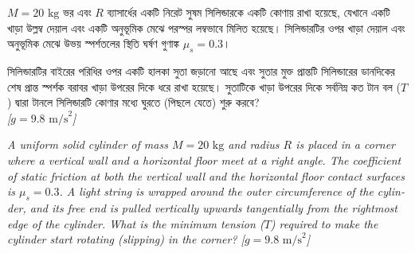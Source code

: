 \documentclass[12pt, a4paper]{article}
\begin{document}
\begin{tcolorbox}[questionbox={প্রশ্ন (Question) 8}]
\noindent
$M = 20\text{ kg}$ ভর এবং $R$ ব্যাসার্ধের একটি নিরেট সুষম সিলিন্ডারকে একটি কোণায় রাখা হয়েছে, যেখানে একটি খাড়া উল্লম্ব দেয়াল এবং একটি অনুভূমিক মেঝে পরস্পর লম্বভাবে মিলিত হয়েছে। সিলিন্ডারটির ওপর খাড়া দেয়াল এবং অনুভূমিক মেঝে উভয় স্পর্শতলের স্থিতি ঘর্ষণ গুণাঙ্ক $\mu_s = 0.3$। 

\vspace{0.3em}
\noindent
সিলিন্ডারটির বাইরের পরিধির ওপর একটি হালকা সুতা জড়ানো আছে এবং সুতার মুক্ত প্রান্তটি সিলিন্ডারের ডানদিকের শেষ প্রান্ত স্পর্শক বরাবর খাড়া উপরের দিকে ধরে রাখা হয়েছে। সুতাটিকে খাড়া উপরের দিকে সর্বনিম্ন কত টান বল ($T$) দ্বারা টানলে সিলিন্ডারটি কোণার মধ্যে ঘুরতে (পিছলে যেতে) শুরু করবে? \\
\textit{[$g = 9.8\text{ m/s}^2$]}

\vspace{0.8em}
\begin{english}
\noindent\textit{\color{darkgray}
A uniform solid cylinder of mass $M = 20\text{ kg}$ and radius $R$ is placed in a corner where a vertical wall and a horizontal floor meet at a right angle. The coefficient of static friction at both the vertical wall and the horizontal floor contact surfaces is $\mu_s = 0.3$. A light string is wrapped around the outer circumference of the cylinder, and its free end is pulled vertically upwards tangentially from the rightmost edge of the cylinder. What is the minimum tension ($T$) required to make the cylinder start rotating (slipping) in the corner? [$g = 9.8\text{ m/s}^2$]
}
\end{english}
\end{tcolorbox}
\end{document}

